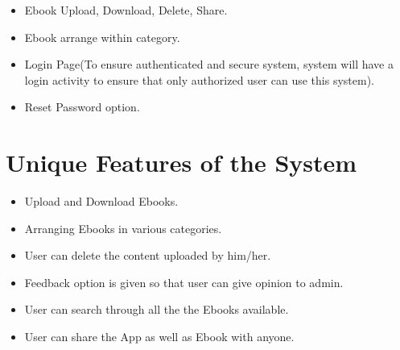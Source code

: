 \begin{itemize}
	\item Ebook Upload, Download, Delete, Share.

	\item Ebook arrange within category.
	
	\item Login Page(To ensure authenticated and secure system, system will have a login activity to ensure that only authorized user can use this system).
	
	\item Reset Password option.
\end{itemize}

 
\section{Unique Features of the System}
\begin{itemize}

\item Upload and Download Ebooks.
\item Arranging Ebooks in various categories.
\item User can delete the content uploaded by him/her.
\item Feedback option is given so that user can give opinion to admin.
\item User can search through all the the Ebooks available.
\item User can share the App as well as Ebook with anyone. 
\end{itemize}


